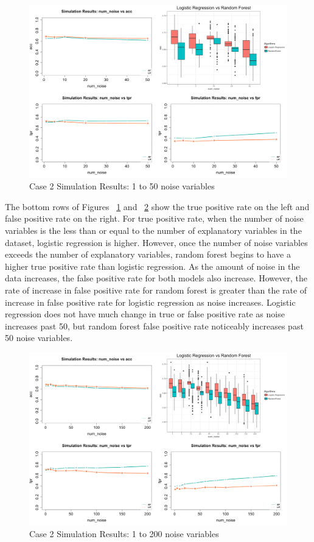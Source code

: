 \documentclass{llncs}
\begin{document}
\begin{figure}
\centering
\includegraphics[scale=0.55]{case2.png}
\caption{Case 2 Simulation Results: 1 to 50 noise variables}
\label{fig:case2results}
\end{figure}

The bottom rows of Figures ~\ref{fig:case2results} and ~\ref{fig:case2resultsb} show the true positive rate on the left and false positive rate on the right.  For true positive rate, when the number of noise variables is the less than or equal to the number of explanatory variables in the dataset, logistic regression is higher.  However, once the number of noise variables exceeds the number of explanatory variables, random forest begins to have a higher true positive rate than logistic regression.  As the amount of noise in the data increases, the false positive rate for both models also increase.  However, the rate of increase in false positive rate for random forest is greater than the rate of increase in false positive rate for logistic regression as noise increases.  Logistic regression does not have much change in true or false positive rate as noise increases past 50, but random forest false positive rate noticeably increases past 50 noise variables.

\begin{figure}
\centering
\includegraphics[scale=0.55]{case2_b.png}
\caption{Case 2 Simulation Results: 1 to 200 noise variables}
\label{fig:case2resultsb}
\end{figure}
\end{document}
